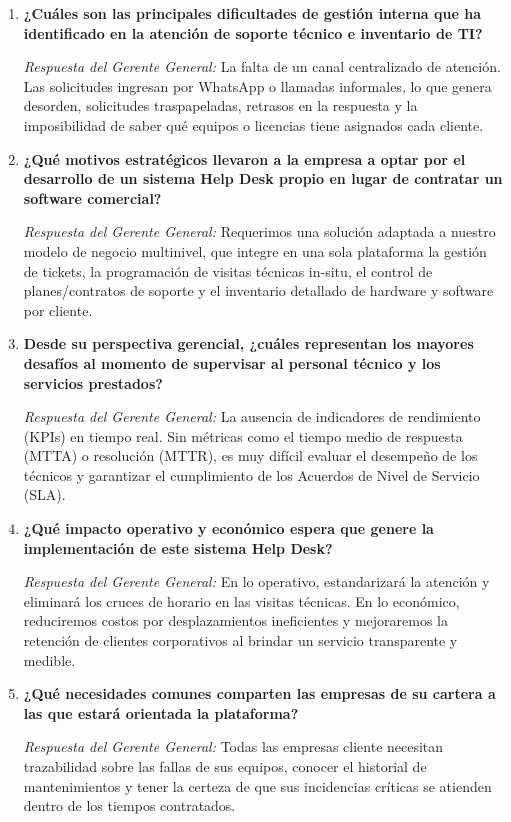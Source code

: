 \begin{enumerate}[leftmargin=*, label=\textbf{P\arabic*.}]
    \item \textbf{¿Cuáles son las principales dificultades de gestión interna que ha identificado en la atención de soporte técnico e inventario de TI?}
    
    \textit{Respuesta del Gerente General:} La falta de un canal centralizado de atención. Las solicitudes ingresan por WhatsApp o llamadas informales, lo que genera desorden, solicitudes traspapeladas, retrasos en la respuesta y la imposibilidad de saber qué equipos o licencias tiene asignados cada cliente.

    \item \textbf{¿Qué motivos estratégicos llevaron a la empresa a optar por el desarrollo de un sistema Help Desk propio en lugar de contratar un software comercial?}
    
    \textit{Respuesta del Gerente General:} Requerimos una solución adaptada a nuestro modelo de negocio multinivel, que integre en una sola plataforma la gestión de tickets, la programación de visitas técnicas in-situ, el control de planes/contratos de soporte y el inventario detallado de hardware y software por cliente.

    \item \textbf{Desde su perspectiva gerencial, ¿cuáles representan los mayores desafíos al momento de supervisar al personal técnico y los servicios prestados?}
    
    \textit{Respuesta del Gerente General:} La ausencia de indicadores de rendimiento (KPIs) en tiempo real. Sin métricas como el tiempo medio de respuesta (MTTA) o resolución (MTTR), es muy difícil evaluar el desempeño de los técnicos y garantizar el cumplimiento de los Acuerdos de Nivel de Servicio (SLA).

    \item \textbf{¿Qué impacto operativo y económico espera que genere la implementación de este sistema Help Desk?}
    
    \textit{Respuesta del Gerente General:} En lo operativo, estandarizará la atención y eliminará los cruces de horario en las visitas técnicas. En lo económico, reduciremos costos por desplazamientos ineficientes y mejoraremos la retención de clientes corporativos al brindar un servicio transparente y medible.

    \item \textbf{¿Qué necesidades comunes comparten las empresas de su cartera a las que estará orientada la plataforma?}
    
    \textit{Respuesta del Gerente General:} Todas las empresas cliente necesitan trazabilidad sobre las fallas de sus equipos, conocer el historial de mantenimientos y tener la certeza de que sus incidencias críticas se atienden dentro de los tiempos contratados.
\end{enumerate}

